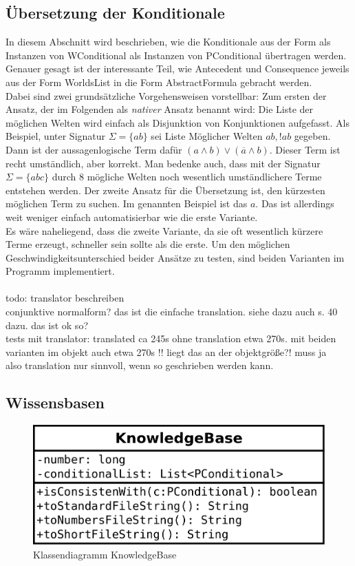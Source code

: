 \documentclass[12pt,a4paper]{article}
\begin{document}
\subsection{Übersetzung der Konditionale}
\label{sec:übersetzung}
In diesem Abschnitt wird beschrieben, wie die Konditionale aus der Form als Instanzen von WConditional als Instanzen von PConditional übertragen werden. Genauer gesagt ist der interessante Teil, wie Antecedent und Consequence jeweils aus der Form WorldsList in die Form AbstractFormula gebracht werden. \\
Dabei sind zwei grundsätzliche Vorgehensweisen vorstellbar: Zum ersten der Ansatz, der im Folgenden als \textit{nativer} Ansatz benannt wird: Die Liste der möglichen Welten wird einfach als Disjunktion von Konjunktionen aufgefasst. Als Beispiel, unter Signatur $\Sigma=\{ab\}$ sei Liste Möglicher Welten $ab, !ab$ gegeben. Dann ist der aussagenlogische Term dafür $(a \wedge b) \vee (\overline{a}\wedge b)$. Dieser Term ist recht umständlich, aber korrekt. Man bedenke auch, dass mit der Signatur $\Sigma=\{abc\}$ durch 8 mögliche Welten noch wesentlich umständlichere Terme entstehen werden. Der zweite Ansatz für die Übersetzung ist, den kürzesten möglichen Term zu suchen. Im genannten Beispiel ist das $a$. Das ist allerdings weit weniger einfach automatisierbar wie die erste Variante. \\
Es wäre naheliegend, dass die zweite Variante, da sie oft wesentlich kürzere Terme erzeugt, schneller sein sollte als die erste. Um den möglichen Geschwindigkeitsunterschied beider Ansätze zu testen, sind beiden Varianten im Programm implementiert.\\
\\todo: translator beschreiben \\
conjunktive normalform? das ist die einfache translation. siehe dazu auch \cite{beierle19b} s. 40 dazu. das ist ok so? \\
tests mit translator: translated ca 245s ohne translation etwa 270s.
mit beiden varianten im objekt auch etwa 270s !! liegt das an der objektgröße?! muss ja \\
also translation nur sinnvoll, wenn so geschrieben werden kann.
\subsection{Wissensbasen}



\begin{figure}
\includegraphics[width=0.45\linewidth]{bilder/KnowledgeBase.png}
\caption{Klassendiagramm KnowledgeBase}
\label{pic:knowledgebase}
\end{figure}
\end{document}
